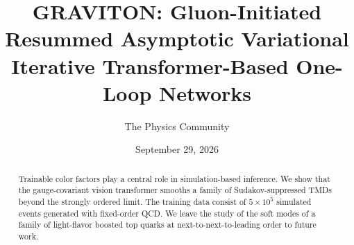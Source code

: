 \documentclass[11pt]{article}
\title{GRAVITON: Gluon-Initiated Resummed Asymptotic Variational Iterative Transformer-Based One-Loop Networks}
\author{The Physics Community}
\date{September 29, 2026}
\begin{document}
\maketitle
\begin{abstract}
Trainable color factors play a central role in simulation-based
inference. We show that the gauge-covariant vision transformer smooths a
family of Sudakov-suppressed TMDs beyond the strongly ordered limit. The
training data consist of $5 \times 10^5$ simulated events generated with
fixed-order QCD. We leave the study of the soft modes of a family of
light-flavor boosted top quarks at next-to-next-to-leading order to
future work.
\end{abstract}
\tableofcontents






\nocite{*}


\end{document}
